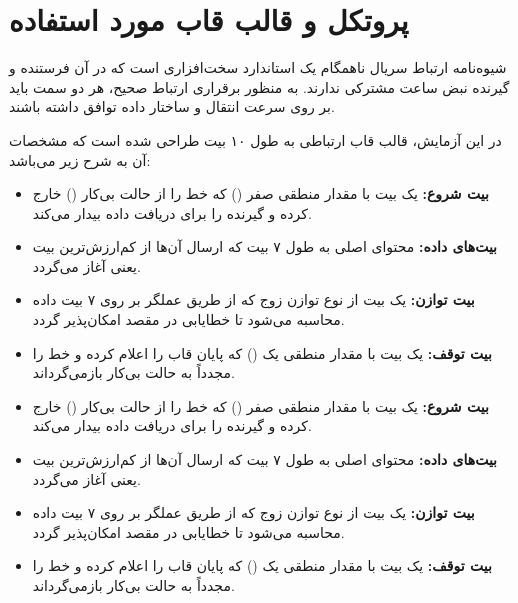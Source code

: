 \section{پروتکل \texorpdfstring{}{UART} و قالب قاب مورد استفاده}
شیوه‌نامه ارتباط سریال ناهمگام یک استاندارد سخت‌افزاری است که در آن فرستنده و گیرنده نبض ساعت مشترکی ندارند. به منظور برقراری ارتباط صحیح، هر دو سمت باید بر روی سرعت انتقال و ساختار داده توافق داشته باشند.

در این آزمایش، قالب قاب ارتباطی به طول ۱۰ بیت طراحی شده است که مشخصات آن به شرح زیر می‌باشد:
\begin{itemize}
    \item \textbf{بیت شروع:} یک بیت با مقدار منطقی صفر () که خط را از حالت بی‌کار () خارج کرده و گیرنده را برای دریافت داده بیدار می‌کند.
    \item \textbf{بیت‌های داده:} محتوای اصلی به طول ۷ بیت که ارسال آن‌ها از کم‌ارزش‌ترین بیت یعنی  آغاز می‌گردد.
    \item \textbf{بیت توازن:} یک بیت از نوع توازن زوج که از طریق عملگر  بر روی ۷ بیت داده محاسبه می‌شود تا خطایابی در مقصد امکان‌پذیر گردد.
    \item \textbf{بیت توقف:} یک بیت با مقدار منطقی یک () که پایان قاب را اعلام کرده و خط را مجدداً به حالت بی‌کار بازمی‌گرداند.
\end{itemize}\begin{itemize}
    \item \textbf{بیت شروع:} یک بیت با مقدار منطقی صفر () که خط را از حالت بی‌کار () خارج کرده و گیرنده را برای دریافت داده بیدار می‌کند.
    \item \textbf{بیت‌های داده:} محتوای اصلی به طول ۷ بیت که ارسال آن‌ها از کم‌ارزش‌ترین بیت یعنی  آغاز می‌گردد.
    \item \textbf{بیت توازن:} یک بیت از نوع توازن زوج که از طریق عملگر  بر روی ۷ بیت داده محاسبه می‌شود تا خطایابی در مقصد امکان‌پذیر گردد.
    \item \textbf{بیت توقف:} یک بیت با مقدار منطقی یک () که پایان قاب را اعلام کرده و خط را مجدداً به حالت بی‌کار بازمی‌گرداند.
\end{itemize}

